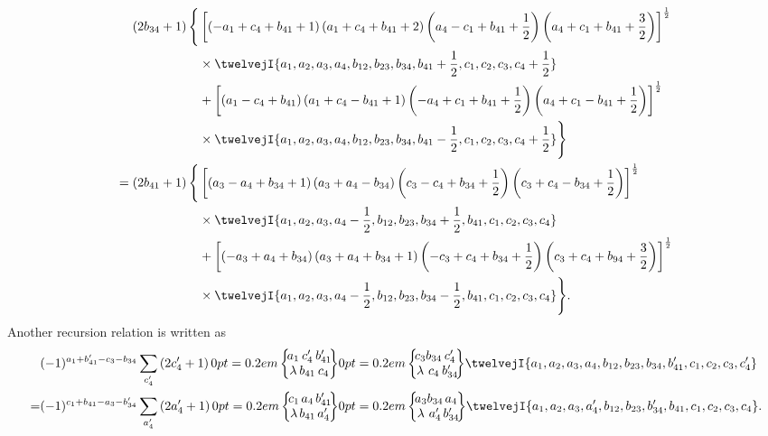 \begin{align}
 \left(2 b_{34}+1\right)\Biggl\{&\left[\left(-a_{1}+c_{4}+b_{41}+1\right)\left(a_{1}+c_{4}+b_{41}+2\right)\left(a_{4}-c_{1}+b_{41}+\frac{1}{2}\right)\left(a_{4}+c_{1}+b_{41}+\frac{3}{2}\right)\right]^{\frac{1}{2}}  \notag\\
& \times\twelvejI{a_{1},a_{2},a_{3},a_{4},b_{12},b_{23},b_{34},b_{41}+\frac{1}{2},c_{1},c_{2},c_{3},c_{4}+\frac{1}{2}}  \notag\\
& +\left[\left(a_{1}-c_{4}+b_{41}\right)\left(a_{1}+c_{4}-b_{41}+1\right)\left(-a_{4}+c_{1}+b_{41}+\frac{1}{2}\right)\left(a_{4}+c_{1}-b_{41}+\frac{1}{2}\right)\right]^{\frac{1}{2}}  \notag\\
& \times\twelvejI{a_{1},a_{2},a_{3},a_{4},b_{12},b_{23},b_{34},b_{41}-\frac{1}{2},c_{1},c_{2},c_{3},c_{4}+\frac{1}{2}}\Biggr\}  \notag\\
 =\left(2 b_{41}+1\right)\Biggl\{&\left[\left(a_{3}-a_{4}+b_{34}+1\right)\left(a_{3}+a_{4}-b_{34}\right)\left(c_{3}-c_{4}+b_{34}+\frac{1}{2}\right)\left(c_{3}+c_{4}-b_{34}+\frac{1}{2}\right)\right]^{\frac{1}{2}}  \notag\\
& \times\twelvejI{a_{1},a_{2},a_{3},a_{4}-\frac{1}{2},b_{12},b_{23},b_{34}+\frac{1}{2},b_{41},c_{1},c_{2},c_{3},c_{4}}  \notag\\
& +\left[\left(-a_{3}+a_{4}+b_{34}\right)\left(a_{3}+a_{4}+b_{34}+1\right)\left(-c_{3}+c_{4}+b_{34}+\frac{1}{2}\right)\left(c_{3}+c_{4}+b_{94}+\frac{3}{2}\right)\right]^{\frac{1}{2}}  \notag\\
& \times\twelvejI{a_{1},a_{2},a_{3},a_{4}-\frac{1}{2},b_{12},b_{23},b_{34}-\frac{1}{2},b_{41},c_{1},c_{2},c_{3},c_{4}}\Biggr\} . \label{eq:10:13:11}
\end{align}
Another recursion relation is written as
\begin{align}
& (-1)^{a_{1}+b_{41}^{\prime}-c_{3}-b_{34}} \sum_{c_{4}^{\prime}}\left(2 c_{4}^{\prime}+1\right)\sixj{a_{1}}{c_{4}^{\prime}}{b_{41}^{\prime}}{\lambda}{b_{41}}{c_{4}}\sixj{c_{3}}{b_{34}}{c_{4}^{\prime}}{\lambda}{c_{4}}{b_{34}^{\prime}}\twelvejI{a_{1},a_{2},a_{3},a_{4},b_{12},b_{23},b_{34},b_{41}^{\prime},c_{1},c_{2},c_{3},c_{4}^{\prime}}  \notag\\
= & (-1)^{c_{1}+b_{41}-a_{3}-b_{34}^{\prime}} \sum_{a_{4}^{\prime}}\left(2 a_{4}^{\prime}+1\right)\sixj{c_{1}}{a_{4}}{b_{41}^{\prime}}{\lambda}{b_{41}}{a_{4}^{\prime}}\sixj{a_{3}}{b_{34}}{a_{4}}{\lambda}{a_{4}^{\prime}}{b_{34}^{\prime}}\twelvejI{a_{1},a_{2},a_{3},a_{4}^{\prime},b_{12},b_{23},b_{34}^{\prime},b_{41},c_{1},c_{2},c_{3},c_{4}} . \label{eq:10:13:12}
\end{align}

